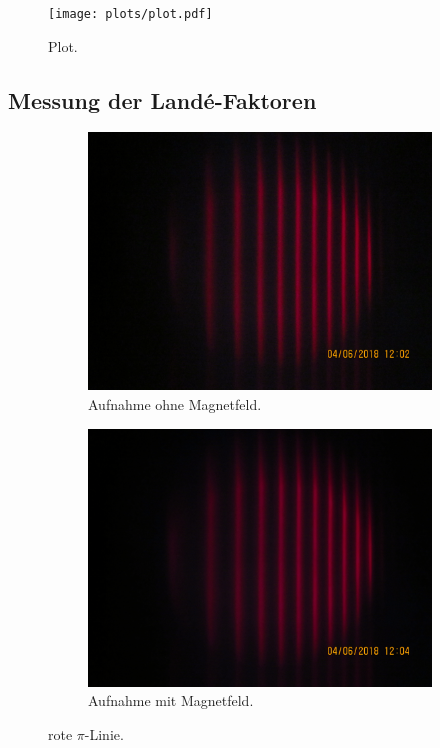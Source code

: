 \begin{figure}
  \centering
  \texttt{[image: plots/plot.pdf]}
  \caption{Plot.}
  \label{fig:plot}
\end{figure}

\subsection{Messung der Landé-Faktoren}

\begin{figure}
  \centering
  \begin{subfigure}{0.48\textwidth}
    \centering
    \includegraphics[width=\textwidth]{graphics/aufnahmen/IMG_1629.jpg}
    \caption{Aufnahme ohne Magnetfeld.}
  \end{subfigure}
  \begin{subfigure}{0.48\textwidth}
    \centering
    \includegraphics[width=\textwidth]{graphics/aufnahmen/IMG_1630.jpg}
    \caption{Aufnahme mit Magnetfeld.}
  \end{subfigure}
  \caption{rote $\pi$-Linie.}
  \label{fig:r_pi}
\end{figure}

